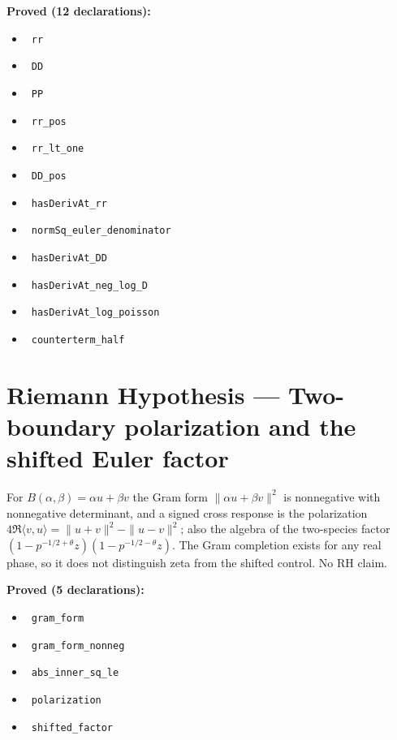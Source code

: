 \documentclass{report}
\theoremstyle{definition}
\begin{document}
\noindent\textbf{Proved (12 declarations):}
\begin{itemize}
  \item {}\leanok\ \texttt{rr}
  \item {}\leanok\ \texttt{DD}
  \item {}\leanok\ \texttt{PP}
  \item {}\leanok\ \texttt{rr\_pos}
  \item {}\leanok\ \texttt{rr\_lt\_one}
  \item {}\leanok\ \texttt{DD\_pos}
  \item {}\leanok\ \texttt{hasDerivAt\_rr}
  \item {}\leanok\ \texttt{normSq\_euler\_denominator}
  \item {}\leanok\ \texttt{hasDerivAt\_DD}
  \item {}\leanok\ \texttt{hasDerivAt\_neg\_log\_D}
  \item {}\leanok\ \texttt{hasDerivAt\_log\_poisson}
  \item {}\leanok\ \texttt{counterterm\_half}
\end{itemize}

\section{Riemann Hypothesis --- Two-boundary polarization and the shifted Euler factor}
For $B(\alpha,\beta)=\alpha u+\beta v$ the Gram form $\|\alpha u+\beta v\|^2$ is nonnegative with nonnegative determinant, and a signed cross response is the polarization $4\Re\langle v,u\rangle=\|u+v\|^2-\|u-v\|^2$; also the algebra of the two-species factor $(1-p^{-1/2+\theta}z)(1-p^{-1/2-\theta}z)$. The Gram completion exists for any real phase, so it does not distinguish zeta from the shifted control. No RH claim.

\noindent\textbf{Proved (5 declarations):}
\begin{itemize}
  \item {}\leanok\ \texttt{gram\_form}
  \item {}\leanok\ \texttt{gram\_form\_nonneg}
  \item {}\leanok\ \texttt{abs\_inner\_sq\_le}
  \item {}\leanok\ \texttt{polarization}
  \item {}\leanok\ \texttt{shifted\_factor}
\end{itemize}
\end{document}
